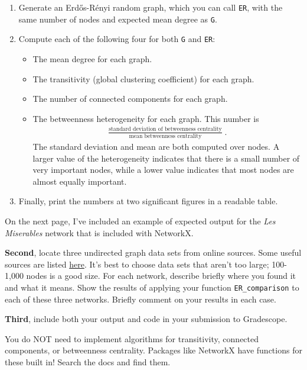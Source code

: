 \documentclass{hw}
\begin{document}
\begin{enumerate}
    \item Generate an Erd\H{o}s-R\'enyi random graph, which you can call \texttt{ER}, with the same number of nodes and expected mean degree as \texttt{G}. 
    \item Compute each of the following four for both \texttt{G} and \texttt{ER}:
    \begin{itemize}
        \item The mean degree for each graph. 
        \item The transitivity (global clustering coefficient) for each graph. 
        \item The number of connected components for each graph. 
        \item The betweenness heterogeneity for each graph. This number is 
        \begin{align}
            \frac{\text{standard deviation of betweenness centrality}}{\text{mean betweenness centrality}}\;.
        \end{align}
        The standard deviation and mean are both computed over nodes. 
        A larger value of the heterogeneity indicates that there is a small number of very important nodes, while a lower value indicates that most nodes are almost equally important. 
    \end{itemize}
    \item Finally, print the numbers at two significant figures in a readable table. 
\end{enumerate}
On the next page, I've included an example of expected output for the \emph{Les Miserables} network that is included with NetworkX. 


\textbf{Second}, locate three undirected graph data sets from online sources. 
Some useful sources are listed \href{http://www.philchodrow.com/intro-networks/appendices/additional_resources.html#data-sets}{here}. 
It's best to choose data sets that aren't too large; 100-1,000 nodes is a good size. 
For each network, describe briefly where you found it and what it means. 
Show the results of applying your function \texttt{ER\_comparison} to each of these three networks. 
Briefly comment on your results in each case. 

\textbf{Third}, include both your output and code in your submission to Gradescope. 

\begin{hint}
    You do NOT need to implement algorithms for transitivity, connected components, or betweenness centrality. 
    Packages like NetworkX have functions for these built in! Search the docs and find them. 
\end{hint}
\end{document}
